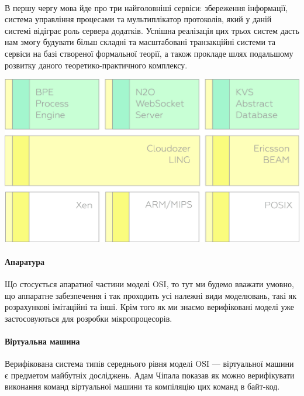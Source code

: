 \documentclass[11pt,oneside]{article}
\begin{document}
   \paragraph{}
   В першу чергу мова йде про три найголовніші
   сервіси: збереження інформації, система управління процесами та мультиплікатор протоколів,
   який у даній системі відіграє роль сервера додатків. Успішна реалізація цих трьох систем
   дасть нам змогу будувати більш складні та масштабовані транзакційні системи та сервіси на базі
   створеної формальної теорії, а також прокладе шлях подальшому розвитку даного
   теоретико-практичного комплексу.

   \begin{center}
   \vspace{0.5cm}
   \includegraphics[scale=0.15]{img/exe-res}
   \end{center}

   \paragraph{\bf Апаратура}
   Що стосується апаратної частини моделі OSI, то тут ми будемо вважати умовно,
   що аппаратне забезпечення і так проходить усі належні види моделювань, такі як
   розрахункові імітаційні та інші. Крім того як ми знаємо верифіковані моделі уже застосовуються
   для розробки мікропроцесорів.

   \paragraph{\bf Віртуальна машина}
   Верифікована система типів середнього рівня моделі OSI --- віртуальної машини
   є предметом майбутніх досліджень. Адам Чіпала \cite{chipvm} показав як можно
   верифікувати виконання команд віртуальної машини та компіляцію цих команд в байт-код.
\end{document}
